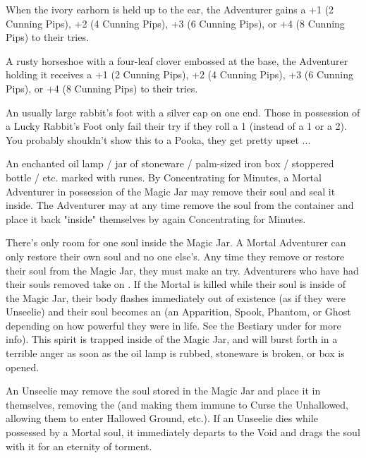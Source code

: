 \MARVELS[
  Name=Ivory Earnhorn,
  Link=marvels-ivory-earhorn,
  Pips=2+
]

When the ivory earhorn is held up to the ear, the Adventurer gains a +1 (2 Cunning Pips), +2 (4 Cunning Pips), +3 (6 Cunning Pips), or +4 (8 Cunning Pips) to their  tries.


\MARVELS[
  Name=Lucky Horseshoe,
  Link=marvels-lucky-horseshoe,
  Pips=2+
]

A rusty horseshoe with a four-leaf clover embossed at the base, the Adventurer holding it receives a +1 (2 Cunning Pips), +2 (4 Cunning Pips), +3 (6 Cunning Pips), or +4 (8 Cunning Pips) to their  tries.


\MARVELS[
  Name=Lucky Rabbit's Foot,
  Link=marvels-lucky-rabbits-foot,
  Pips=8
]

An usually large rabbit's foot with a silver cap on one end. Those in possession of a Lucky Rabbit's Foot only fail their \INJURY try if they roll a 1 (instead of a 1 or a 2). You probably shouldn't show this to a Pooka, they get pretty upset ...


\MARVELS[
  Name=Magic Jar,
  Link=marvels-magic-jar,
  Pips=12
]

An enchanted oil lamp / jar of stoneware / palm-sized iron box / stoppered bottle / etc. marked with runes. By Concentrating for Minutes, a Mortal Adventurer in possession of the Magic Jar may remove their soul and seal it inside. The Adventurer may at any time remove the soul from the container and place it back "inside" themselves by again Concentrating for Minutes.

There's only room for one soul inside the Magic Jar. A Mortal Adventurer can only restore their own soul and no one else's.  Any time they remove or restore their soul from the Magic Jar, they must make an \INSANITY try. Adventurers who have had their souls removed take on . If the Mortal is killed while their soul is inside of the Magic Jar, their body flashes immediately out of existence (as if they were Unseelie) and their soul becomes an  (an Apparition, Spook, Phantom, or Ghost depending on how powerful they were in life. See the Bestiary under  for more info). This spirit is trapped inside of the Magic Jar, and will burst forth in a terrible anger as soon as the oil lamp is rubbed, stoneware is broken, or box is opened.

An Unseelie may remove the soul stored in the Magic Jar and place it in themselves, removing the  (and making them immune to Curse the Unhallowed, allowing them to enter Hallowed Ground, etc.). If an Unseelie dies while possessed by a Mortal soul, it immediately departs to the Void and drags the soul with it for an eternity of torment.

